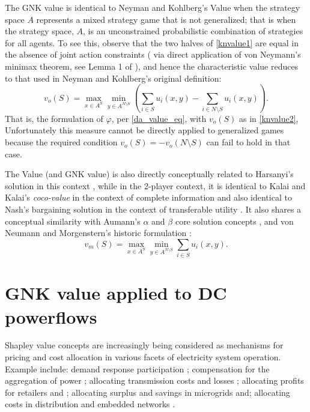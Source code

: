 The GNK value is identical to Neyman and Kohlberg's Value \cite{value2} when the strategy space $A$ represents a mixed strategy game that is not generalized; 
 that is when the strategy space, $A$, is an unconstrained probabilistic combination of strategies for all agents.
To see this, observe that the two halves of \eqref{knvalue1} are equal in the absence of joint action constraints (%
via direct application of von Neymann's minimax theorem, see Lemma 1 of \cite{value2}), 
and hence the characteristic value reduces to that used in Neyman and Kohlberg's original definition:
\begin{equation}\label{knvalue2}v_o(S) = \max_{x\in A^S}\min_{y\in A^{N\setminus S}} \left(\sum_{i\in S} u_i(x,y) - \sum_{i\in N\setminus S} u_i(x,y) \right).\end{equation}
%
That is, the formulation of $\varphi$, per \eqref{da_value_eq}, 
with $v_o(S)$ as in \eqref{knvalue2},
Unfortunately this measure cannot be directly applied to generalized games because the required condition $v_o(S)=-v_o(N\setminus S)$ can fail to hold in that case. 

The Value (and GNK value) is also directly conceptually related to Harsanyi's solution in this context \cite{values3},
while in the 2-player context, it is identical to Kalai and Kalai's \textit{coco-value} in the context of complete information \cite{kalai1,Kalai2010,value2} 
and also identical to Nash's bargaining solution in the context of transferable utility \cite{nash2,value2}.
It also shares a conceptual similarity with Aumann's $\alpha$ and $\beta$ core solution concepts \cite{aumann1961core}, and von Neumann and Morgenstern's historic formulation \cite{1944,KOHLBERG2018139,values3}:
\begin{equation}\label{knvalue3}v_m(S) = \max_{x\in A^S}\min_{y\in A^{N\setminus S}} \sum_{i\in S} u_i(x,y).\end{equation}


\section{GNK value applied to DC powerflows}\label{more_involved}

Shapley value concepts are increasingly being considered as mechanisms for pricing and cost allocation in various facets of electricity system operation.
Example include: demand response participation \cite{DBLP:journals/tsg/OBrienGR15,electronics8010048,WANG201972}; 
compensation for the aggregation of power \cite{Perez-Diaz:2018:CEV:3237383.3237484,6520960};
allocating transmission costs and losses \cite{ip-gtd_20020005,SHARMA201733}; allocating profits for retailers and \cite{ACUNA2018161,WANG201972}; 
allocating surplus and savings in microgrids \cite{WU2017384} and; 
allocating costs in distribution and embedded networks \cite{archie_paper1,8226810,10.1007/978-3-642-40776-5_19,6840296,DBLP:journals/corr/abs-1903-10965,AzuatalamCV_PowerTech2019}.

